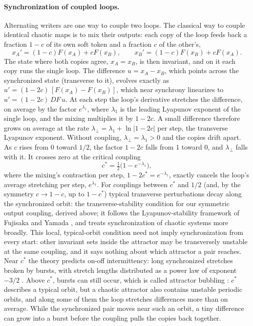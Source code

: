 \documentclass[11pt,letterpaper]{article}
\begin{document}
\paragraph{Synchronization of coupled loops.} Alternating writers are one way to couple two loops. The classical way
to couple identical chaotic maps is to mix their outputs: each copy of the loop feeds back a fraction $1-c$ of its own
soft token and a fraction $c$ of the other's,
\begin{equation}
x_A'=(1-c)F(x_A)+cF(x_B),\qquad x_B'=(1-c)F(x_B)+cF(x_A).
\end{equation}
The state where both copies agree, $x_A=x_B$, is then invariant, and on it each copy runs the single loop. The difference $u=x_A-x_B$, which points across the synchronized state (transverse to it), evolves exactly as
$u'=(1-2c)\,[F(x_A)-F(x_B)]$, which near synchrony linearizes to $u'=(1-2c)\,DF\,u$. At each step the loop's
derivative stretches the difference, on average by the factor $e^{\lambda_1}$, where $\lambda_1$ is the leading
Lyapunov exponent of the single loop, and the mixing multiplies it by $1-2c$. A small difference therefore grows on
average at the rate $\lambda_\perp=\lambda_1+\ln|1-2c|$ per step, the transverse Lyapunov exponent. Without coupling, $\lambda_\perp=\lambda_1>0$ and the copies drift apart. As $c$ rises from 0 toward $1/2$, the
factor $1-2c$ falls from 1 toward 0, and $\lambda_\perp$ falls with it. It crosses zero at the critical coupling
\begin{equation}
c^*=\tfrac12\bigl(1-e^{-\lambda_1}\bigr),
\label{eq:cstar}
\end{equation}
where the mixing's contraction per step, $1-2c^*=e^{-\lambda_1}$, exactly cancels the loop's average stretching per
step, $e^{\lambda_1}$. For couplings between $c^*$ and $1/2$ (and, by the symmetry $c\to1-c$, up to $1-c^*$) typical transverse
perturbations decay along the synchronized orbit: the transverse-stability condition for our symmetric output coupling, derived above; it follows the
Lyapunov-stability framework of Fujisaka and Yamada \cite{fujisaka1983stability}, and \cite{pecora1990synchronization}
treats synchronization of chaotic systems more broadly. This local, typical-orbit condition need not imply synchronization from every start: other
invariant sets inside the attractor may be transversely unstable at the same coupling, and it says nothing about which
attractor a pair reaches. Near
$c^*$ the theory predicts on-off intermittency: long synchronized stretches broken by bursts, with stretch lengths
distributed as a power law of exponent $-3/2$ \cite{platt1993onoff,heagy1994characterization}. Above $c^*$, bursts can still occur, which is called attractor bubbling \cite{ashwin1994bubbling}: $c^*$ describes a
typical orbit, but a chaotic attractor also contains unstable periodic orbits, and along some of them the loop
stretches differences more than on average. While the synchronized pair moves near such an orbit, a tiny difference
can grow into a burst before the coupling pulls the copies back together.
\end{document}
